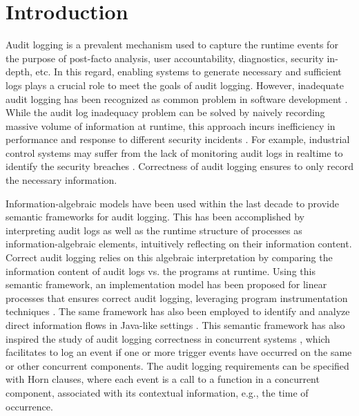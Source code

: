 \section{Introduction} \label{sec:intro}

Audit logging is a prevalent mechanism used to capture the runtime events for the purpose of post-facto analysis, user accountability, diagnostics, security in-depth, etc. In this regard, enabling systems to generate necessary and sufficient logs plays a crucial role to meet the goals of audit logging. However, inadequate audit logging has been recognized as common problem in software development \cite{cwe778,owasp-top-ten}. While the audit log inadequacy  problem can be solved by naively recording massive volume of information at runtime, this approach incurs inefficiency in performance  and response to different security incidents \cite{cwe779}. For example, industrial control systems may suffer from the lack of monitoring audit logs in realtime to identify the security breaches \cite{controlsys}. Correctness of audit logging ensures to only record the necessary information. 

Information-algebraic \cite{Kohlas14}  models have been used within the last decade to provide semantic frameworks for audit logging. This has been accomplished by interpreting audit logs as well as the runtime structure of processes as information-algebraic elements, intuitively reflecting on their information content. Correct audit logging relies on this algebraic interpretation by comparing the information content of audit logs vs. the programs at runtime. Using this semantic framework, an implementation model has been proposed for linear processes that ensures correct audit logging, leveraging program instrumentation techniques \cite{post16}. The same framework has also been employed to identify and analyze direct information flows in Java-like settings \cite{amir-skalka-plas16, jcs20}. This semantic framework has also inspired the study of audit logging correctness in concurrent systems \cite{lsfa20}, which facilitates to log an event if one or more trigger events have occurred on the same or other concurrent components. The audit logging requirements can be specified with Horn clauses, where each event is a call to a function in a concurrent component, associated with its contextual information, e.g., the time of occurrence. 


